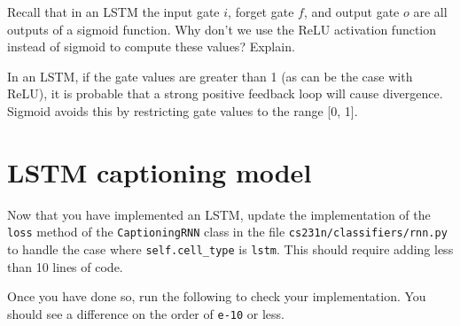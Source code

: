 \documentclass[11pt]{article}
\begin{document}
    Recall that in an LSTM the input gate \(i\), forget gate \(f\), and
output gate \(o\) are all outputs of a sigmoid function. Why don't we
use the ReLU activation function instead of sigmoid to compute these
values? Explain.

In an LSTM, if the gate values are greater than 1 (as can be the case
with ReLU), it is probable that a strong positive feedback loop will
cause divergence. Sigmoid avoids this by restricting gate values to the
range {[}0, 1{]}.

    \section{LSTM captioning model}\label{lstm-captioning-model}

Now that you have implemented an LSTM, update the implementation of the
\texttt{loss} method of the \texttt{CaptioningRNN} class in the file
\texttt{cs231n/classifiers/rnn.py} to handle the case where
\texttt{self.cell\_type} is \texttt{lstm}. This should require adding
less than 10 lines of code.

Once you have done so, run the following to check your implementation.
You should see a difference on the order of \texttt{e-10} or less.
\end{document}
